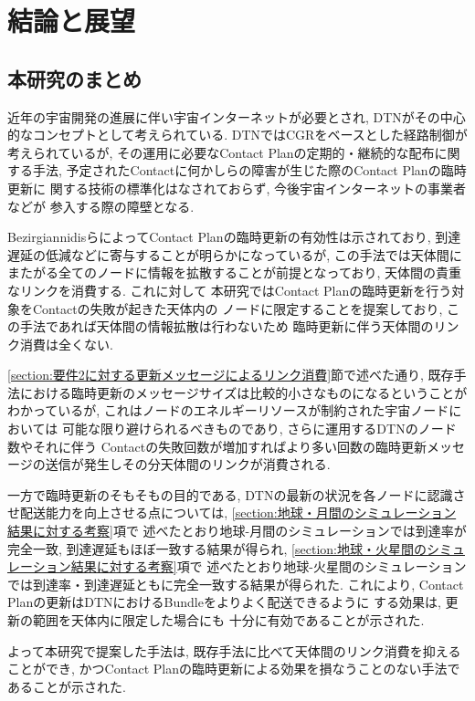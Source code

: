 \chapter{結論と展望}
\label{chap:conclusion}
\section{本研究のまとめ}
近年の宇宙開発の進展に伴い宇宙インターネットが必要とされ, 
DTNがその中心的なコンセプトとして考えられている. 
DTNではCGRをベースとした経路制御が考えられているが, 
その運用に必要なContact Planの定期的・継続的な配布に関する手法, 
予定されたContactに何かしらの障害が生じた際のContact Planの臨時更新に
関する技術の標準化はなされておらず, 今後宇宙インターネットの事業者などが
参入する際の障壁となる.

BezirgiannidisらによってContact Planの臨時更新の有効性は示されており,
到達遅延の低減などに寄与することが明らかになっているが,
この手法では天体間にまたがる全てのノードに情報を拡散することが前提となっており, 
天体間の貴重なリンクを消費する. これに対して
本研究ではContact Planの臨時更新を行う対象をContactの失敗が起きた天体内の
ノードに限定することを提案しており, この手法であれば天体間の情報拡散は行わないため
臨時更新に伴う天体間のリンク消費は全くない. 

\ref{section:要件2に対する更新メッセージによるリンク消費}節で述べた通り, 
既存手法における臨時更新のメッセージサイズは比較的小さなものになるということがわかっているが,
これはノードのエネルギーリソースが制約された宇宙ノードにおいては
可能な限り避けられるべきものであり, さらに運用するDTNのノード数やそれに伴う
Contactの失敗回数が増加すればより多い回数の臨時更新メッセージの送信が発生しその分天体間のリンクが消費される. 

一方で臨時更新のそもそもの目的である, DTNの最新の状況を各ノードに認識させ配送能力を向上させる点については, 
\ref{section:地球・月間のシミュレーション結果に対する考察}項で
述べたとおり地球-月間のシミュレーションでは到達率が完全一致, 到達遅延もほぼ一致する結果が得られ, 
\ref{section:地球・火星間のシミュレーション結果に対する考察}項で
述べたとおり地球-火星間のシミュレーションでは到達率・到達遅延ともに完全一致する結果が得られた. 
これにより, Contact Planの更新はDTNにおけるBundleをよりよく配送できるように
する効果は, 更新の範囲を天体内に限定した場合にも
十分に有効であることが示された. 

よって本研究で提案した手法は, 既存手法に比べて天体間のリンク消費を抑えることができ,
かつContact Planの臨時更新による効果を損なうことのない手法であることが示された.


